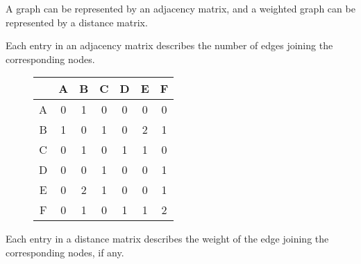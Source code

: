 \documentclass[../main.tex]{subfile}
\begin{document}

A graph can be represented by an adjacency matrix, and a weighted graph can be represented by a distance matrix.


Each entry in an adjacency matrix describes the number of edges joining the corresponding nodes.

\begin{figure}[H]
\hspace{0.02\linewidth}
\begin{minipage}{0.48\linewidth}
	\centering
	{\renewcommand{\arraystretch}{1.15}
	\begin{tabular}{c|c c c c c c}
		& A & B & C & D & E & F\\
		\hline
		A & 0 & 1 & 0 & 0 & 0 & 0\\
		B & 1 & 0 & 1 & 0 & 2 & 1\\
		C & 0 & 1 & 0 & 1 & 1 & 0\\
		D & 0 & 0 & 1 & 0 & 0 & 1\\
		E & 0 & 2 & 1 & 0 & 0 & 1\\
		F & 0 & 1 & 0 & 1 & 1 & 2
	\end{tabular}}
\end{minipage}\hfill
\begin{minipage}{0.45\linewidth}
	\vspace{2em}
\end{minipage}
\hspace{0.02\linewidth}
\end{figure}


Each entry in a distance matrix describes the weight of the edge joining the corresponding nodes, if any.
\end{document}
